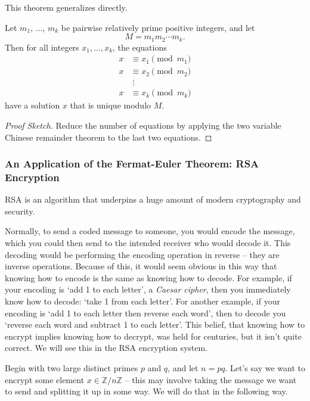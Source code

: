 \documentclass[a4paper]{scrartcl}
\begin{document}
This theorem generalizes directly.

\begin{theorem}
	Let $m_1$, $\dots$, $m_k$ be pairwise relatively prime positive integers, and let 
	$$M = m_1 m_2 \cdots m_k.
	$$ Then for all integers $x_1, \dots, x_k$, the equations
	\begin{align*}
		x & \equiv x_1 \pmod{m_1} \\
		x & \equiv x_2 \pmod{m_2} \\
			& \;\vdots \\
		x & \equiv x_k \pmod{m_k}
	\end{align*}
	have a solution $x$ that is unique modulo $M$.
\end{theorem}
\begin{proof}[Proof Sketch]
	Reduce the number of equations by applying the two variable Chinese remainder theorem to the last two equations.
\end{proof}

\subsubsection{An Application of the Fermat-Euler Theorem: RSA Encryption}

RSA is an algorithm that underpins a huge amount of modern cryptography and security. 

Normally, to send a coded message to someone, you would encode the message, which you could then send to the intended receiver who would decode it. This decoding would be performing the encoding operation in reverse -- they are inverse operations. Because of this, it would seem obvious in this way that knowing how to encode is the same as knowing how to decode.
For example, if your encoding is `add 1 to each letter', a \emph{
	Caesar cipher}, then you immediately know how to decode: `take 1 from each letter'.
	For another example, if your encoding is `add 1 to each letter then reverse each word', then to decode you `reverse each word and subtract 1 to each letter'. 
This belief, that knowing how to encrypt implies knowing how to decrypt, was held for centuries, but it isn't quite correct. We will see this in the RSA encryption system.

Begin with two large distinct primes $p$ and $q$, and let $n = pq$. Let's say we want to encrypt some element $x \in \mathbb{Z}/n\mathbb{Z}$ -- this may involve taking the message we want to send and splitting it up in some way. We will do that in the following way.
\end{document}
